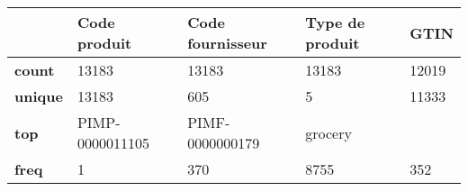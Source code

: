 \begin{tabularx}{\linewidth}{lXXXX}
\toprule
{} &     Code produit & Code fournisseur & Type de produit &   GTIN \\
\midrule
\textbf{count } &            13183 &            13183 &           13183 &  12019 \\
\textbf{unique} &            13183 &              605 &               5 &  11333 \\
\textbf{top   } &  PIMP-0000011105 &  PIMF-0000000179 &         grocery &        \\
\textbf{freq  } &                1 &              370 &            8755 &    352 \\
\bottomrule
\end{tabularx}
